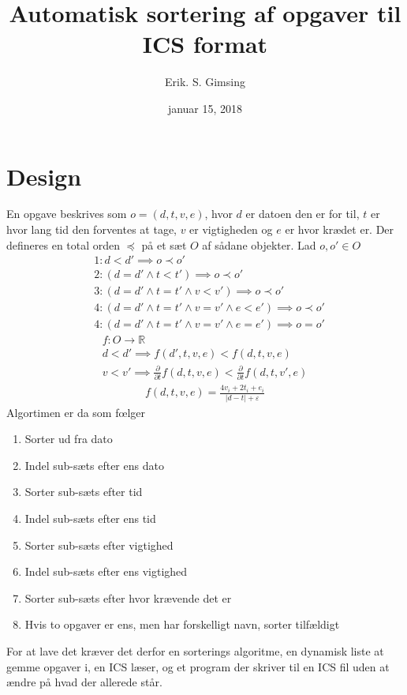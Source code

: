 \documentclass{article}
\title{Automatisk sortering af opgaver til ICS format}
\author{Erik. S. Gimsing}
\date{januar 15, 2018}
\begin{document}
\maketitle
\section{Design}
En opgave beskrives som $o = (d,t,v,e)$, hvor $d$ er datoen den er for til, $t$
er hvor lang tid den forventes at tage, $v$ er vigtigheden og $e$ er hvor
kr{\ae}det er. Der defineres en total orden $\preceq$ p{\aa} et s{\ae}t $O$ af
s{\aa}dane objekter. Lad $o,o' \in O$
\begin{align*}
	&1:d < d' \implies o \prec o' \\
	&2:(d = d' \land t < t') \implies o \prec o' \\
	&3:(d = d' \land t = t' \land v < v') \implies o \prec o' \\
	&4:(d = d' \land t = t' \land v = v' \land e < e') \implies o \prec o' \\
	&4:(d = d' \land t = t' \land v = v' \land e = e') \implies o = o'
\end{align*}
\begin{align*}
	f: O \rightarrow \mathbb{R} \\
	d < d' \implies f(d',t,v,e) < f(d,t,v,e) \\
	v < v' \implies \frac{\partial}{\partial t} f(d,t,v,e) <
	\frac{\partial}{\partial t} f(d,t,v',e)
\end{align*}
\begin{align*}
	f(d,t,v,e) = \frac{4v_i+2t_i+e_i}{|d-t|+\varepsilon}
\end{align*}
Algortimen er da som f{\oe}lger
\begin{enumerate}
	\item Sorter ud fra dato
	\item Indel sub-s{\ae}ts efter ens dato
	\item Sorter sub-s{\ae}ts efter tid
	\item Indel sub-s{\ae}ts efter ens tid
	\item Sorter sub-s{\ae}ts efter vigtighed
	\item Indel sub-s{\ae}ts efter ens vigtighed
	\item Sorter sub-s{\ae}ts efter hvor kr{\ae}vende det er
	\item Hvis to opgaver er ens, men har forskelligt navn, sorter
		tilf{\ae}ldigt
\end{enumerate}
For at lave det kr{\ae}ver det derfor en sorterings algoritme, en dynamisk liste
at gemme opgaver i, en ICS l{\ae}ser, og et program der skriver til en ICS fil
uden at {\ae}ndre p{\aa} hvad der allerede st{\aa}r.
\end{document}
